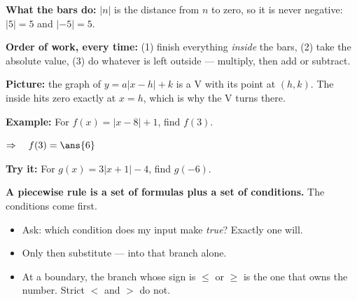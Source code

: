 \documentclass[12pt]{article}
\begin{document}


\begin{formulabox}
\textbf{What the bars do:} $|n|$ is the distance from $n$ to zero, so it is never
negative: $|5| = 5$ and $|-5| = 5$.\par
\smallskip
\textbf{Order of work, every time:} (1) finish everything \emph{inside} the bars,
(2) take the absolute value, (3) do whatever is left outside --- multiply, then add or
subtract.\par
\smallskip
\textbf{Picture:} the graph of $y = a|x - h| + k$ is a V with its point at $(h, k)$. The
inside hits zero exactly at $x = h$, which is why the V turns there.
\end{formulabox}

\begin{examplebox}
\textbf{Example:} \quad For $f(x) = |x - 8| + 1$, find $f(3)$.

$\Rightarrow\quad f(3) = \ans{6}$
\end{examplebox}

\begin{tryitbox}
\textbf{Try it:} \quad For $g(x) = 3|x + 1| - 4$, find $g(-6)$.\\[2pt]
\end{tryitbox}


\begin{formulabox}
\textbf{A piecewise rule is a set of formulas plus a set of conditions.} The conditions
come first.
\begin{itemize}[label={$\bullet$}, leftmargin=1.1cm, itemsep=1pt, topsep=2pt]
  \item Ask: which condition does my input make \emph{true}? Exactly one will.
  \item Only then substitute --- into that branch alone.
  \item At a boundary, the branch whose sign is $\leq$ or $\geq$ is the one that owns
        the number. Strict $<$ and $>$ do not.
\end{itemize}
\end{formulabox}
\end{document}
